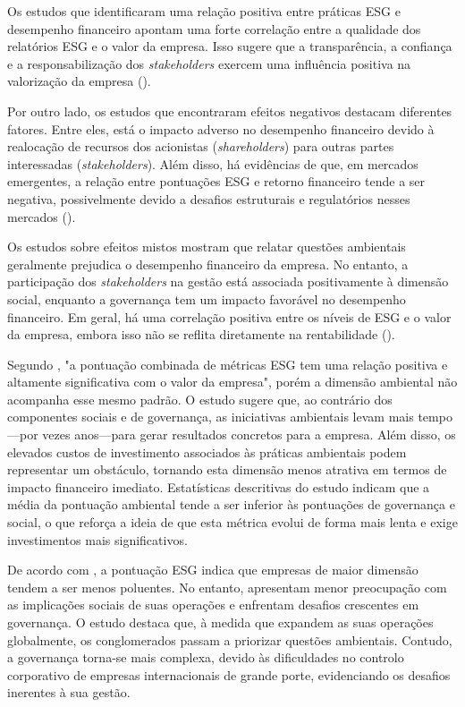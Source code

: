 Os estudos que identificaram uma relação positiva entre práticas ESG e desempenho financeiro apontam uma forte correlação entre a qualidade dos relatórios ESG e o valor da empresa. Isso sugere que a transparência, a confiança e a responsabilização dos \textit{stakeholders} exercem uma influência positiva na valorização da empresa (\cite{Aydomu2022}).

Por outro lado, os estudos que encontraram efeitos negativos destacam diferentes fatores. Entre eles, está o impacto adverso no desempenho financeiro devido à realocação de recursos dos acionistas (\textit{shareholders}) para outras partes interessadas (\textit{stakeholders}). Além disso, há evidências de que, em mercados emergentes, a relação entre pontuações ESG e retorno financeiro tende a ser negativa, possivelmente devido a desafios estruturais e regulatórios nesses mercados (\cite{Aydomu2022}).

Os estudos sobre efeitos mistos mostram que relatar questões ambientais geralmente prejudica o desempenho financeiro da empresa. No entanto, a participação dos \textit{stakeholders} na gestão está associada positivamente à dimensão social, enquanto a governança tem um impacto favorável no desempenho financeiro. Em geral, há uma correlação positiva entre os níveis de ESG e o valor da empresa, embora isso não se reflita diretamente na rentabilidade (\cite{Aydomu2022}).

Segundo \cite{Aydomu2022}, "a pontuação combinada de métricas ESG tem uma relação positiva e altamente significativa com o valor da empresa", porém a dimensão ambiental não acompanha esse mesmo padrão. O estudo sugere que, ao contrário dos componentes sociais e de governança, as iniciativas ambientais levam mais tempo—por vezes anos—para gerar resultados concretos para a empresa. Além disso, os elevados custos de investimento associados às práticas ambientais podem representar um obstáculo, tornando esta dimensão menos atrativa em termos de impacto financeiro imediato. Estatísticas descritivas do estudo indicam que a média da pontuação ambiental tende a ser inferior às pontuações de governança e social, o que reforça a ideia de que esta métrica evolui de forma mais lenta e exige investimentos mais significativos.

De acordo com \cite{Cohen2023}, a pontuação ESG indica que empresas de maior dimensão tendem a ser menos poluentes. No entanto, apresentam menor preocupação com as implicações sociais de suas operações e enfrentam desafios crescentes em governança. O estudo destaca que, à medida que expandem as suas operações globalmente, os conglomerados passam a priorizar questões ambientais. Contudo, a governança torna-se mais complexa, devido às dificuldades no controlo corporativo de empresas internacionais de grande porte, evidenciando os desafios inerentes à sua gestão.

